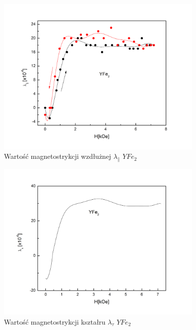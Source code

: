 \documentclass[a4paper,12pt]{article}
\numberwithin{equation}{section}
\begin{document}
\begin{figure}[h]
    \centering
    \includegraphics[width =0.9\textwidth]{../img/magneto/Ywzdluzna}
    \caption{Wartość magnetostrykcji wzdłużnej $\lambda_{\parallel}$ $YFe_2$}
    \label{Ywzdluzna}
\end{figure}

\begin{figure}[h]
    \centering
    \includegraphics[width =0.9\textwidth]{../img/magneto/YKsztaltu}
    \caption{Wartość magnetostrykcji kształru $\lambda_{\tau}$ $YFe_2$}
    \label{YKsztaltu}
\end{figure}
\end{document}

